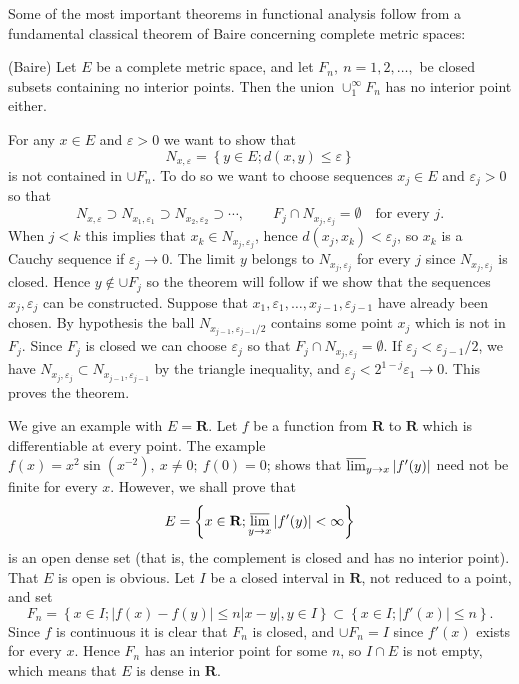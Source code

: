 Some of the most important theorems in functional analysis follow from
a fundamental classical theorem of Baire concerning complete metric
spaces:
\begin{thm}\label{thm:2.1.1}
  (Baire) Let $E$ be a complete metric space, and let $F_n,\ 
  n=1,2,\dots,$ be closed subsets containing no interior points. Then
  the union $\cup_1^{\infty}F_n$ has no interior point either.
\end{thm}
\begin{prf}
  For any $x\in E$ and $\varepsilon>0$ we want to show that
  \begin{displaymath}
    N_{x,\varepsilon} = \left\{ y\in E;d(x,y)\leq\varepsilon \right\}
  \end{displaymath}
is not contained in $\cup F_n$. To do so we want to choose sequences
$x_j\in E$ and $\varepsilon_j>0$ so that
\begin{displaymath}
  N_{x,\varepsilon}\supset N_{x_1,\varepsilon_1}\supset
  N_{x_2,\varepsilon_2}\supset\cdots,\qquad F_j\cap
  N_{x_j,\varepsilon_j}=\emptyset \quad \text{for every } j.
\end{displaymath}
When $j<k$ this implies that $x_k\in N_{x_j,\varepsilon_j}$, hence
$d(x_j,x_k)<\varepsilon_j$, so $x_k$ is a Cauchy sequence if
$\varepsilon_j\to 0$. The limit $y$ belongs to $N_{x_j,\varepsilon_j}$ for
every $j$ since $N_{x_j,\varepsilon_j}$ is closed. Hence $y\notin\cup
F_j$ so the theorem will follow if we show that the sequences
$x_j,\varepsilon_j$ can be constructed. Suppose that
$x_1,\varepsilon_1,\dots,x_{j-1},\varepsilon_{j-1}$ have already been
chosen. By hypothesis the ball $N_{x_{j-1},\varepsilon_{j-1}/2}$ contains
some point $x_j$ which is not in $F_j$. Since $F_j$ is closed we can
choose $\varepsilon_j$ so that $F_j\cap N_{x_j,\varepsilon_j}=\emptyset$. If
$\varepsilon_j<\varepsilon_{j-1}/2$, we have $N_{x_j,\varepsilon_j}\subset
N_{x_{j-1},\varepsilon_{j-1}}$ by the triangle inequality, and
$\varepsilon_j<2^{1-j}\varepsilon_1\to 0$. This proves the theorem.
\end{prf}
\begin{exa}
  We give an example with $E=\mathbf{R}$. Let $f$ be a function from
  $\mathbf{R}$ to $\mathbf{R}$ which is differentiable at every
  point. The example $f(x)=x^2\sin(x^{-2}),\ x\neq0;\ f(0)=0$; shows
  that $\varlimsup_{y\to x}|f'(y)|$ need not be finite for every
  $x$. However, we shall prove that
  \begin{displaymath}
    E=\left\{ x\in\mathbf{R};\varlimsup_{y\to x}|f'(y)|<\infty \right\}
  \end{displaymath}
is an open dense set (that is, the complement is closed and has no
interior point). That $E$ is open is obvious. Let $I$ be a closed
interval in $\mathbf{R}$, not reduced to a point, and set
\begin{displaymath}
  F_n=\left\{ x\in I;|f(x)-f(y)|\leq n|x-y|,y\in I \right\}\subset
  \left\{ x\in I;|f'(x)|\leq n \right\}.
\end{displaymath}
Since $f$ is continuous it is clear that $F_n$ is closed, and $\cup
F_n=I$ since $f'(x)$ exists for every $x$. Hence $F_n$ has an interior
point for some $n$, so $I\cap E$ is not empty, which means that $E$ is
dense in $\mathbf{R}$.
\end{exa}
